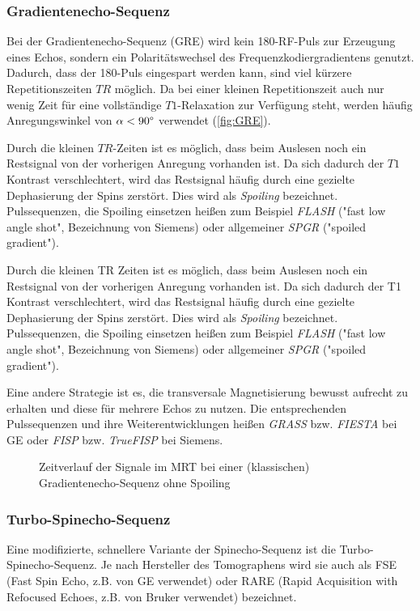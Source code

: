 \subsubsection{Gradientenecho-Sequenz}
\label{sec:GRE}
Bei der Gradientenecho-Sequenz (GRE) wird kein 180\degree-RF-Puls zur Erzeugung eines Echos, sondern ein Polaritätswechsel des Frequenzkodiergradientens genutzt. Dadurch, dass der 180\degree-Puls eingespart werden kann, sind viel kürzere Repetitionszeiten $TR$ möglich. Da bei einer kleinen Repetitionszeit auch nur wenig Zeit für eine vollständige $T1$-Relaxation zur Verfügung steht, werden häufig Anregungswinkel von $\alpha<90\degree$ verwendet (\autoref{fig:GRE}).

Durch die kleinen $TR$-Zeiten ist es möglich, dass beim Auslesen noch ein Restsignal von der vorherigen Anregung vorhanden ist. Da sich dadurch der $T1$ Kontrast verschlechtert, wird das Restsignal häufig durch eine gezielte Dephasierung der Spins zerstört. Dies wird als \textit{Spoiling} bezeichnet. Pulssequenzen, die Spoiling einsetzen heißen zum Beispiel \textit{FLASH} ("fast low angle shot", Bezeichnung von Siemens) oder allgemeiner \textit{SPGR} ("spoiled gradient").


Durch die kleinen TR Zeiten ist es möglich, dass beim Auslesen noch ein Restsignal von der vorherigen Anregung vorhanden ist. Da sich dadurch der T1 Kontrast verschlechtert, wird das Restsignal häufig durch eine gezielte Dephasierung der Spins zerstört. Dies wird als \textit{Spoiling} bezeichnet. Pulssequenzen, die Spoiling einsetzen heißen zum Beispiel \textit{FLASH} ("fast low angle shot", Bezeichnung von Siemens) oder allgemeiner \textit{SPGR} ("spoiled gradient").

Eine andere Strategie ist es, die transversale Magnetisierung bewusst aufrecht zu erhalten und diese für mehrere Echos zu nutzen. Die entsprechenden Pulssequenzen und ihre Weiterentwicklungen heißen \textit{GRASS} bzw. \textit{FIESTA} bei GE oder \textit{FISP} bzw. \textit{TrueFISP} bei Siemens.

\begin{figure}[H]
	\centering
	\caption[Gradientenecho-Sequenz]{Zeitverlauf der Signale im MRT bei einer (klassischen) Gradientenecho-Sequenz ohne Spoiling}
	\label{fig:GRE}
\end{figure}

\subsubsection{Turbo-Spinecho-Sequenz}
Eine modifizierte, schnellere Variante der Spinecho-Sequenz ist die Turbo-Spinecho-Sequenz. Je nach Hersteller des Tomographens wird sie auch als FSE (Fast Spin Echo, z.B. von GE verwendet) oder RARE (Rapid Acquisition with Refocused Echoes, z.B. von Bruker verwendet) bezeichnet.

